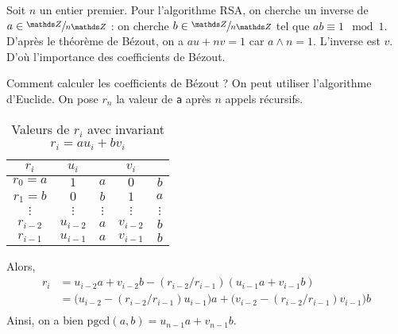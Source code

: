 \documentclass[a4paper]{article}
\begin{document}
	\bigskip

	Soit $n$ un entier premier.
	Pour l'algorithme RSA, on cherche un inverse de $a \in \sfrac{\Z}{n\Z}$ : on cherche $b \in \sfrac\Z{n\Z}$ tel que $ab \equiv 1 \mod 1$. D'après le théorème de Bézout, on a $au + nv = 1$ car $a \wedge n = 1$. L'inverse est $v$. D'où l'importance des coefficients de Bézout.

	Comment calculer les coefficients de Bézout ?
	On peut utiliser l'algorithme d'Euclide.
	On pose $r_n$\/ la valeur de \texttt{a} après $n$ appels récursifs.

	\begin{table}[H]
		\centering
		\begin{tabular}{c|c|c|c|c}
			$r_i$ & $u_i$ & & $v_i$ &\\ \hline \hline
			$r_0 = a$ & $1$ & $a$ & $0$ & $b$\\
			$r_1 = b$ & $0$ & $b$ & $1$ & $a$\\
			$\vdots$ & $\vdots$ & $\vdots$ & $\vdots$ & $\vdots$ \\
			$r_{i-2}$ & $u_{i-2}$ & $a$ & $v_{i-2}$ & $b$\\
			$r_{i-1}$ & $u_{i-1}$ & $a$ & $v_{i-1}$ & $b$ \\
		\end{tabular}
		\caption{Valeurs de $r_i$ avec invariant $r_i = a u_i + b v_i$}
	\end{table}

	Alors,
	\begin{align*}
		r_i &= u_{i-2} a + v_{i-2} b - (r_{i-2} / r_{i-1}) (u_{i-1}a + v_{i-1} b)\\
		&= \big(u_{i-2} - (r_{i-2}/r_{i-1}) u_{i-1}\big) a + \big(v_{i-2} - (r_{i-2}/r_{i-1}) v_{i-1}\big) b \\
	\end{align*}
	Ainsi, on a bien $\mathrm{pgcd}(a,b) = u_{n-1} a + v_{n-1} b$.
\end{document}
